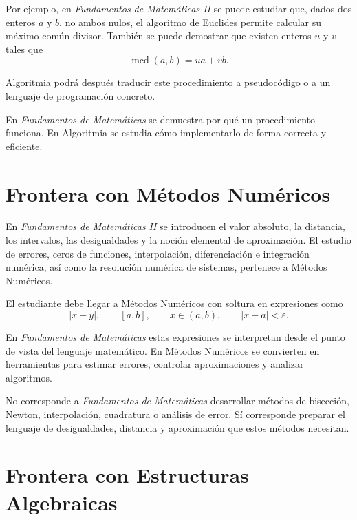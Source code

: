 Por ejemplo, en \emph{Fundamentos de Matemáticas II} se puede estudiar que, dados dos enteros \(a\) y \(b\), no ambos nulos, el algoritmo de Euclides permite calcular su máximo común divisor. También se puede demostrar que existen enteros \(u\) y \(v\) tales que
\[
  \operatorname{mcd}(a,b)=ua+vb.
\]

Algoritmia podrá después traducir este procedimiento a pseudocódigo o a un lenguaje de programación concreto.

\begin{advertencia}
En \emph{Fundamentos de Matemáticas} se demuestra por qué un procedimiento funciona. En Algoritmia se estudia cómo implementarlo de forma correcta y eficiente.
\end{advertencia}

\section{Frontera con Métodos Numéricos}

\begin{convencion}
En \emph{Fundamentos de Matemáticas II} se introducen el valor absoluto, la distancia, los intervalos, las desigualdades y la noción elemental de aproximación. El estudio de errores, ceros de funciones, interpolación, diferenciación e integración numérica, así como la resolución numérica de sistemas, pertenece a Métodos Numéricos.
\end{convencion}

El estudiante debe llegar a Métodos Numéricos con soltura en expresiones como
\[
  |x-y|, \qquad [a,b], \qquad x\in (a,b), \qquad |x-a|<\varepsilon.
\]

En \emph{Fundamentos de Matemáticas} estas expresiones se interpretan desde el punto de vista del lenguaje matemático. En Métodos Numéricos se convierten en herramientas para estimar errores, controlar aproximaciones y analizar algoritmos.

\begin{advertencia}
No corresponde a \emph{Fundamentos de Matemáticas} desarrollar métodos de bisección, Newton, interpolación, cuadratura o análisis de error. Sí corresponde preparar el lenguaje de desigualdades, distancia y aproximación que estos métodos necesitan.
\end{advertencia}

\section{Frontera con Estructuras Algebraicas}


